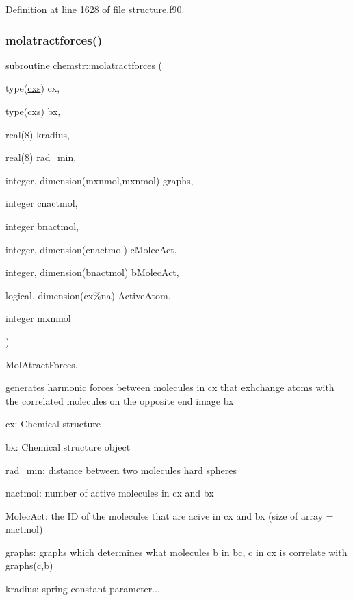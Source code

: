 Definition at line 1628 of file structure.\+f90.

\mbox{\label{namespacechemstr_a3acc7c59e5b1773d5624966eab42579d}} 
\subsubsection{\texorpdfstring{molatractforces()}{molatractforces()}}
{\footnotesize\ttfamily subroutine chemstr\+::molatractforces (\begin{DoxyParamCaption}\item[{type(\mbox{\hyperlink{structchemstr_1_1cxs}{cxs}})}]{cx,  }\item[{type(\mbox{\hyperlink{structchemstr_1_1cxs}{cxs}})}]{bx,  }\item[{real(8)}]{kradius,  }\item[{real(8)}]{rad\+\_\+min,  }\item[{integer, dimension(mxnmol,mxnmol)}]{graphs,  }\item[{integer}]{cnactmol,  }\item[{integer}]{bnactmol,  }\item[{integer, dimension(cnactmol)}]{c\+Molec\+Act,  }\item[{integer, dimension(bnactmol)}]{b\+Molec\+Act,  }\item[{logical, dimension(cx\%na)}]{Active\+Atom,  }\item[{integer}]{mxnmol }\end{DoxyParamCaption})}



Mol\+Atract\+Forces. 

generates harmonic forces between molecules in cx that exhchange atoms with the correlated molecules on the opposite end image bx


\begin{DoxyItemize}
\item cx\+: Chemical structure
\item bx\+: Chemical structure object
\item rad\+\_\+min\+: distance between two molecules hard spheres
\item nactmol\+: number of active molecules in cx and bx
\item Molec\+Act\+: the ID of the molecules that are acive in cx and bx (size of array = nactmol)
\item graphs\+: graphs which determines what molecules b in bc, c in cx is correlate with graphs(c,b)
\item kradius\+: spring constant parameter... 
\end{DoxyItemize}

